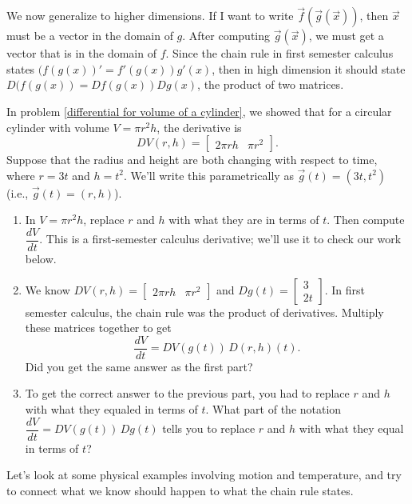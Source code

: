 We now generalize to higher dimensions. If I want to write $\vec f(\vec g(\vec x))$, then $\vec x$ must be a vector in the domain of $g$.  After computing $\vec g(\vec x)$, we must get a vector that is in the domain of $f$.  Since the chain rule in first semester calculus states $(f(g(x))'=f'(g(x))g'(x)$, then in high dimension it should state $D(f(g(x)) = Df(g(x))Dg(x)$, the product of two matrices. 

\begin{problem}
 In problem \ref{differential for volume of a cylinder}, we showed that for a circular cylinder with volume $V=\pi r^2 h$, the derivative is 
$$DV(r,h)=\begin{bmatrix}
2\pi rh & \pi r^2
\end{bmatrix}.$$  
Suppose that the radius and height are both changing with respect to time, where $r=3t$ and $h=t^2$. We'll write this parametrically as $\vec g(t) =(3t, t^2)$ (i.e., $\vec g(t)=(r,h)$).
\begin{enumerate}
 \item In $V=\pi r^2 h$, replace $r$ and $h$ with what they are in terms of $t$. Then compute $\dfrac{dV}{dt}$. This is a first-semester calculus derivative; we'll use it to check our work below.
 \item We know 
$DV(r,h)=\begin{bmatrix}
2\pi rh & \pi r^2
\end{bmatrix}$ and
$Dg(t)=
\begin{bmatrix}
3\\  2t
\end{bmatrix}.$
In first semester calculus, the chain rule was the product of derivatives. Multiply these matrices together to get $$\dfrac{dV}{dt}=DV(g(t))\, D(r,h)(t).$$ Did you get the same answer as the first part? 
 \item To get the correct answer to the previous part, you had to replace $r$ and $h$ with what they equaled in terms of $t$.  What part of the notation $\dfrac{dV}{dt}=DV(g(t))\, Dg(t)$ tells you to replace $r$ and $h$ with what they equal in terms of $t$?
\end{enumerate}



\end{problem}


Let's look at some physical examples involving motion and temperature, and try to connect what we know should happen to what the chain rule states.


